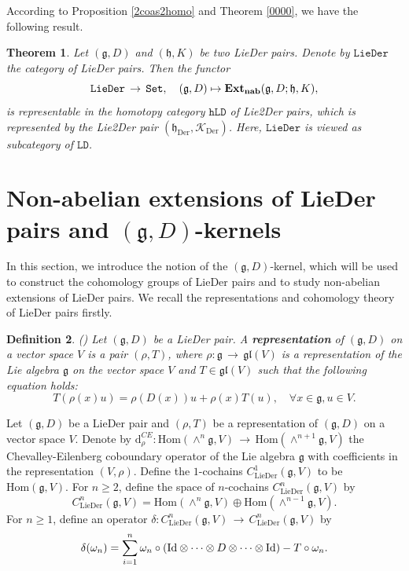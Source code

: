\documentclass[12pt]{amsart}
\newtheorem{thm}{Theorem}[section]
\newtheorem{defi}[thm]{Definition}
\newcommand{\lon }{\,\rightarrow\,}
\newcommand{\g}{\mathfrak g}
\newcommand{\h}{\mathfrak h}
\newcommand{\huaK}{\mathcal{K}}
\newcommand{\dM}{\mathrm{d}}
\newcommand{\Id}{{\rm{Id}}}
\newcommand{\Hom}{\mathrm{Hom}}
\newcommand{\LD}{{\rm LieDer }}
\newcommand{\LtoD}{{\rm Lie2Der }}
\newcommand{\Der}{\mathrm{Der}}
\newcommand{\gl}{\mathfrak {gl}}
\begin{document}
According to Proposition \ref{2coas2homo} and Theorem \ref{0000}, we have the following result.
\begin{thm}
    Let $(\g,D)$ and $(\h,K)$ be two \LD pairs. Denote by $\mathtt{LieDer}$ the category of \LD pairs. Then the functor
    \begin{equation*}
       \mathtt{LieDer}\lon\mathtt{Set},\quad  (\g,D)\mapsto {\rm{\bf Ext_{nab}}}(\g,D;\h,K),
    \end{equation*}
    is representable in the homotopy category $\mathtt{hLD}$ of \LtoD pairs, which is represented by the \LtoD pair $(\h_{\Der},\huaK_{\Der})$. Here, $\mathtt{LieDer}$ is viewed as subcategory of $\mathtt{LD}$.
\end{thm}


\section{Non-abelian extensions of LieDer pairs and $(\g, D)$-kernels}
In this section, we introduce the notion of the $(\g, D)$-kernel, which will be used to construct the cohomology groups of \LD pairs and to study non-abelian extensions of \LD pairs. We recall the representations and cohomology theory of \LD pairs firstly.
\begin{defi}{\rm(\cite{TFS})}
Let $(\g, D)$ be a {\rm LieDer} pair. A {\bf representation} of $(\g, D)$ on a vector space $V$ is a pair $(\rho, T)$, where $\rho:\g\lon\gl(V)$ is a representation of the Lie algebra $\g$ on the vector space $V$ and $T\in\gl(V)$ such that the following equation holds:
\begin{equation}\label{ldrep}
    T(\rho(x)u)=\rho(D(x))u+\rho(x)T(u), \quad \forall x\in\g, u\in V.
\end{equation}
\end{defi}
Let $(\g, D)$ be a {\rm LieDer} pair and $(\rho, T)$ be a representation of $(\g, D)$ on a vector space $V$. Denote by $\dM_\rho^{CE}:\Hom(\wedge^{n}\g, V)\lon\Hom(\wedge^{n+1}\g, V)$ the Chevalley-Eilenberg coboundary operator of the Lie algebra $\g$ with coefficients in the representation $(V, \rho)$. Define the $1$-cochains $C^{1}_{\mathrm{LieDer}}(\g, V)$ to be $\Hom(\g, V)$. For $n\geq 2$, define the space of $n$-cochains $C^{n}_{\mathrm{LieDer}}(\g, V)$ by
$$
C^{n}_{\mathrm{LieDer}}(\g, V)=\Hom(\wedge^{n}\g, V)\oplus\Hom(\wedge^{n-1}\g, V).
$$
For $n\geq 1$, define an operator $\delta:C^{n}_{\mathrm{LieDer}}(\g, V)\lon C^{n}_{\mathrm{LieDer}}(\g, V)$ by
\begin{equation}\label{deeqsigma}
\delta(\omega_n)=\sum_{i=1}^{n}\omega_n\circ(\Id\otimes\cdots\otimes D\otimes\cdots\otimes\Id)-T\circ\omega_n.
\end{equation}
\end{document}
